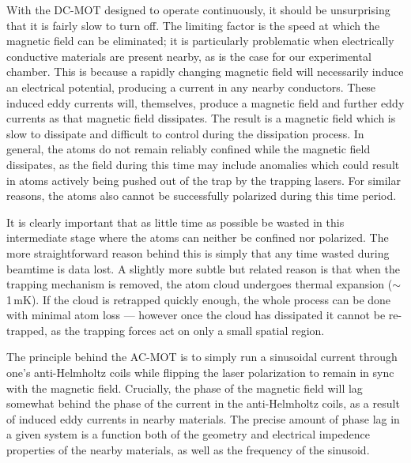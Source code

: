 With the DC-MOT designed to operate continuously, 
it should be unsurprising that it 
is fairly slow to turn off.  The limiting factor is the speed at which the magnetic field can be eliminated; it is particularly problematic when electrically conductive materials are present nearby, as is the case for our experimental chamber.  
This is because a rapidly changing magnetic field will necessarily induce an electrical potential, producing a current in any nearby conductors.  These induced eddy currents will, themselves, produce a magnetic field and further eddy currents as that magnetic field dissipates.  The result is a magnetic field which is slow to dissipate and difficult to control during the dissipation process.  In general, the atoms do not remain reliably confined while the magnetic field dissipates, as the field during this time may include anomalies which could result in atoms actively being pushed out of the trap by the trapping lasers.  For similar reasons, the atoms also cannot be successfully polarized during this time period.  

It is clearly important that as little time as possible be wasted in this intermediate stage where the atoms can neither be confined nor polarized.  The more straightforward reason behind this is simply that any time wasted during beamtime is data lost.  A slightly more subtle but related reason is that when the trapping mechanism is removed, the atom cloud undergoes thermal expansion ($\sim$1\,mK).  If the cloud is retrapped quickly enough, the whole process can be done with minimal atom loss --- however once the cloud has dissipated it cannot be re-trapped, as the trapping forces act on only a small spatial region.

The principle behind the AC-MOT is to simply run a sinusoidal current through one's anti-Helmholtz coils while flipping the laser polarization to remain in sync with the magnetic field.  Crucially, the phase of the magnetic field will lag somewhat behind the phase of the current in the anti-Helmholtz coils, as a result of induced eddy currents in nearby materials.  The precise amount of phase lag in a given system is a function both of the geometry and electrical impedence properties of the nearby materials, as well as the frequency of the sinusoid.  

\note[note]{}

